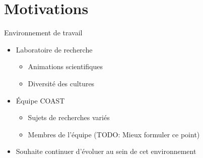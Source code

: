 \documentclass[xcolor=table]{beamer}
\begin{document}


\section{Motivations}

\begin{frame}{Environnement de travail}
  \begin{itemize}
    \item Laboratoire de recherche
      \begin{itemize}
      \item Animations scientifiques
      \item Diversité des cultures
      \end{itemize}
    \item Équipe COAST
      \begin{itemize}
      \item Sujets de recherches variés
      \item Membres de l'équipe (TODO: Mieux formuler ce point)
      \end{itemize}
    \item Souhaite continuer d'évoluer au sein de cet environnement
  \end{itemize}
\end{frame}
\end{document}
